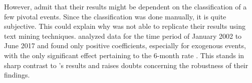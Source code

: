 \documentclass[11pt,a4paper,english,oneside]{book}
\numberwithin{equation}{chapter}
\begin{document}
However, \citet[~p. 20]{Ellingsen.2003} admit that their results might be dependent on the classification of a few pivotal events. Since the classification was done manually, it is quite subjective. This could explain why \cite{Krosigk.2017} was not able to replicate their results using text mining techniques.  analyzed data for the time period of January 2002 to June 2017 and found only positive coefficients, especially for exogenous events, with the only significant effect pertaining to the 6-month rate \citeyearpar[~p. 36]{Krosigk.2017}. This stands in sharp contrast to \citeauthor{Ellingsen.2003}'s results and raises doubts concerning the robustness of their findings.

%	
%
\end{document}
